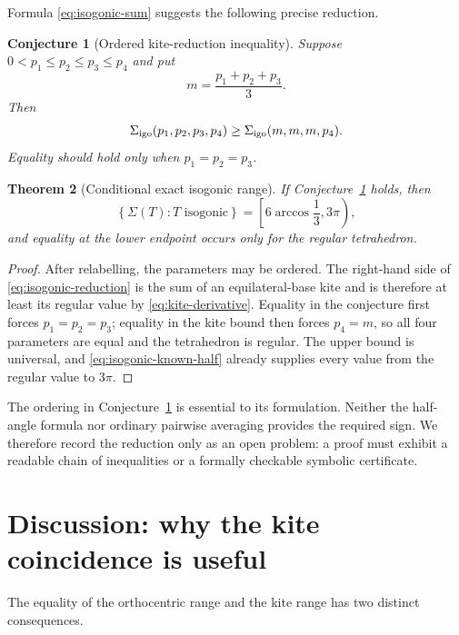 \documentclass[11pt,a4paper]{article}
\newtheorem{theorem}{Theorem}[section]
\newtheorem{conjecture}[theorem]{Conjecture}
\theoremstyle{definition}
\theoremstyle{remark}
\begin{document}
Formula \eqref{eq:isogonic-sum} suggests the following precise reduction.

\begin{conjecture}[Ordered kite-reduction inequality]
\label{conj:isogonic-reduction}
Suppose $0<p_1\leq p_2\leq p_3\leq p_4$ and put
\[
 m=\frac{p_1+p_2+p_3}{3}.
\]
Then
\begin{equation}\label{eq:isogonic-reduction}
 \Sigma_{\rm igo}(p_1,p_2,p_3,p_4)
 \geq \Sigma_{\rm igo}(m,m,m,p_4).
\end{equation}
Equality should hold only when $p_1=p_2=p_3$.
\end{conjecture}

\begin{theorem}[Conditional exact isogonic range]
\label{thm:conditional-isogonic}
If Conjecture~\ref{conj:isogonic-reduction} holds, then
\begin{equation}\label{eq:conditional-isogonic-range}
 \left\{\Sigma(T):T\text{ isogonic}\right\}
 =\left[6\arccos\frac13,3\pi\right),
\end{equation}
and equality at the lower endpoint occurs only for the regular tetrahedron.
\end{theorem}

\begin{proof}
After relabelling, the parameters may be ordered.  The right-hand side of
\eqref{eq:isogonic-reduction} is the sum of an equilateral-base kite and is
therefore at least its regular value by \eqref{eq:kite-derivative}.  Equality
in the conjecture first forces $p_1=p_2=p_3$; equality in the kite bound then
forces $p_4=m$, so all four parameters are equal and the tetrahedron is
regular.  The upper bound is universal, and \eqref{eq:isogonic-known-half}
already supplies every value from the regular value to $3\pi$.
\end{proof}

The ordering in Conjecture~\ref{conj:isogonic-reduction} is essential to its
formulation.  Neither the half-angle formula nor ordinary pairwise averaging
provides the required sign.  We therefore record the reduction only as an
open problem: a proof must exhibit a readable chain of inequalities or a
formally checkable symbolic certificate.

\section{Discussion: why the kite coincidence is useful}

The equality of the orthocentric range and the kite range has
two distinct consequences.
\end{document}
